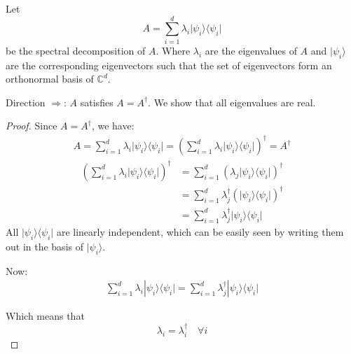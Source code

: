 \documentclass{article}
\newcommand{\bra}[1]{\langle #1|}
\newcommand{\ket}[1]{|#1\rangle}
\newcommand{\ketbra}[2]{\ket{#1}{\bra{#2}}}
\newcommand{\complex}{{\mathbb C}}
\begin{document}
\begin{enumerate}
\begin{enumerate}
                Let $$A = \sum_{i=1}^d \lambda_i \ketbra{\psi_i}{\psi_i}$$ be the spectral decomposition of $A$.
                Where $\lambda_i$ are the eigenvalues of $A$ and $\ket{\psi_i}$ are the corresponding eigenvectors
                such that the set of eigenvectors form an orthonormal basis of $\complex^d$.

                Direction $\Rightarrow$: $A$ satisfies $A=A^\dagger$. We show that all eigenvalues are real.
                \begin{proof}
                  Since $A=A^\dagger$, we have:
                  \begin{equation}
                    \begin{aligned}
                      A=\sum_{i=1}^d \lambda_i \ketbra{\psi_i}{\psi_i}=\left(\sum_{i=1}^d \lambda_i \ketbra{\psi_i}{\psi_i}\right)^\dagger=A^\dagger
                    \end{aligned}
                  \end{equation}
                  \begin{equation}
                    \begin{aligned}
                      \left(\sum_{i=1}^d \lambda_i \ketbra{\psi_i}{\psi_i}\right)^\dagger & =\sum_{i=1}^d \left(\lambda_j \ketbra{\psi_i}{\psi_i}\right)^\dagger \\
                                                                                          & =\sum_{i=1}^d \lambda_j^\dagger (\ketbra{\psi_i}{\psi_i})^\dagger    \\
                                                                                          & =\sum_{i=1}^d \lambda_j^\dagger \ketbra{\psi_i}{\psi_i}
                    \end{aligned}
                  \end{equation}
                  All $\ketbra{\psi_i}{\psi_i}$ are linearly independent, which can be easily seen by writing them out in the basis
                  of $\ket{\psi_i}$.

                  Now:
                  \begin{equation}
                    \begin{aligned}
                      \sum_{i=1}^d \lambda_i \ketbra{\psi_i}{\psi_i}=\sum_{i=1}^d \lambda_j^\dagger \ketbra{\psi_i}{\psi_i}
                    \end{aligned}
                  \end{equation}

                  Which means that
                  \begin{equation}
                    \lambda_i=\lambda_i^\dagger \quad \forall i
                  \end{equation}


\end{proof}
\end{enumerate}
\end{enumerate}
\end{document}
